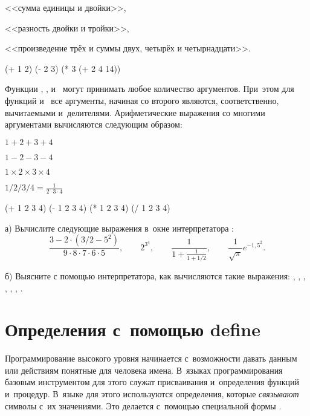 \begin{example}{%
<<сумма единицы и двойки>>,

<<разность двойки и тройки>>,

<<произведение трёх и суммы двух, четырёх и четырнадцати>>.}
\begin{ExampleCode}
(+ 1 2)
(- 2 3)
(* 3 (+ 2 4 14))
\end{ExampleCode}
\end{example}

Функции \s{+}, \s{*}, \s{-} и~\s{/} могут принимать любое количество аргументов. При~этом для функций \s{-} и~\s{/} все аргументы, начиная со второго являются, соответственно, вычитаемыми и~делителями. Арифметические выражения со многими аргументами вычисляются следующим образом:

\begin{example}{%
$1+2+3+4$

$1-2-3-4$

$1\times2\times3\times4$

$1/2/3/4 = \frac{1}{2\cdot3\cdot4}$}
\begin{ExampleCode}
(+ 1 2 3 4)
(- 1 2 3 4)
(* 1 2 3 4)
(/ 1 2 3 4)
\end{ExampleCode}
\end{example}

\begin{Assignment}
а) Вычислите следующие выражения в~окне интерпретатора \DrRacket:
$$
\frac{3- 2\cdot(3/2-5^2)}{9\cdot 8\cdot 7\cdot 6\cdot 5},\qquad
2^{3^4},\qquad
\frac{1}{1+\frac{1}{1+1/2}},\qquad
\frac{1}{\sqrt{\pi}}e^{-1,5^2}.
$$

б) Выясните с помощью интерпретатора, как вычисляются такие выражения: \s{+}, , \s{(+)}, , \s{(-)}, , \s{(/)}.
\end{Assignment}



\section{Определения с~помощью define}%
\label{define}Программирование высокого уровня начинается с~возможности давать данным или действиям понятные для человека имена. В~языках программирования базовым инструментом для этого служат присваивания и~определения функций и~процедур. В~языке \Scheme для этого
используются определения, которые \emph{связывают} символы с~их значениями. Это делается с~помощью специальной формы .

